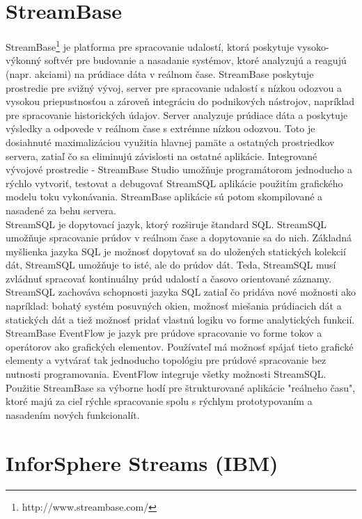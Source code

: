 \section{StreamBase}
StreamBase\footnote{http://www.streambase.com/} je platforma pre spracovanie udalostí, ktorá poskytuje vysoko-výkonný softvér pre budovanie a nasadanie systémov, ktoré analyzujú a reagujú (napr. akciami) na prúdiace dáta v reálnom čase. StreamBase poskytuje prostredie pre svižný vývoj, server pre spracovanie udalostí s nízkou odozvou a vysokou priepustnosťou a zároveň integráciu do podnikových nástrojov, napríklad pre spracovanie historických údajov. Server analyzuje prúdiace dáta a poskytuje výsledky a odpovede v reálnom čase s extrémne nízkou odozvou. Toto je dosiahnuté maximalizáciou využitia hlavnej pamäte a ostatných prostriedkov servera, zatiaľ čo sa eliminujú závislosti na ostatné aplikácie. Integrované vývojové prostredie - StreamBase Studio umožňuje programátorom jednoducho a rýchlo vytvoriť, testovat a debugovať StreamSQL aplikácie použitím grafického modelu toku vykonávania. StreamBase aplikácie sú potom skompilované a nasadené za behu servera. \\

StreamSQL je dopytovací jazyk, ktorý rozširuje štandard SQL. StreamSQL umožňuje spracovanie prúdov v reálnom čase a dopytovanie sa do nich. Základná myšlienka jazyka SQL je možnosť dopytovať sa do uložených statických kolekcií dát, StreamSQL umožňuje to isté, ale do prúdov dát. Teda, StreamSQL musí zvládnuť spracovať kontinuálny prúd udalostí a časovo orientované záznamy. StreamSQL zachováva schopnosti jazyka SQL zatiaľ čo pridáva nové možnosti ako napríklad: bohatý systém posuvných okien, možnosť miešania prúdiacich dát a statických dát a tiež možnosť pridať vlastnú logiku vo forme analytických funkcií. \\

StreamBase EventFlow je jazyk pre prúdove spracovanie vo forme tokov a operátorov ako grafických elementov. Používateľ má možnosť spájať tieto grafické elementy a vytvárať tak jednoducho topológiu pre prúdové spracovanie bez nutnosti programovania. EventFlow integruje všetky možnosti StreamSQL. \\

Použitie StreamBase sa výborne hodí pre štrukturované aplikácie "reálneho času", ktoré majú za cieľ rýchle spracovanie spolu s rýchlym prototypovaním a nasadením nových funkcionalít.
\label{fig:streambase}

\section{InforSphere Streams (IBM)}



















